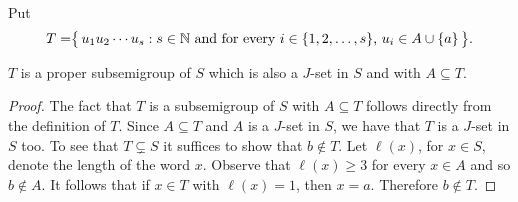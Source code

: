 \begin{defn}
  Put 
  \[
    T = \bigr\{\, u_1u_2\cdots u_s : \mbox{$s \in \mathbb{N}$ and for every $i \in \{1, 2, \ldots, s\}$, $u_i \in A \cup\{a\}$} \,\bigr\}.
  \]
\end{defn}

\begin{lem}
  $T$ is a proper subsemigroup of $S$ which is also a $J$-set in $S$ and with $A \subseteq T$.
\end{lem}
\begin{proof}
  The fact that $T$ is a subsemigroup of $S$ with $A \subseteq T$ follows directly from the definition of $T$.
  Since $A \subseteq T$ and $A$ is a $J$-set in $S$, we have that $T$ is a $J$-set in $S$ too.
  To see that $T \subsetneq S$ it suffices to show that $b \not\in T$.
  Let $\ell(x)$, for $x \in S$, denote the length of the word $x$.
  Observe that $\ell(x) \ge 3$ for every $x \in A$ and so $b \not\in A$.
  It follows that if $x \in T$ with $\ell(x) = 1$, then $x = a$.
  Therefore $b \not\in T$. 
\end{proof}

